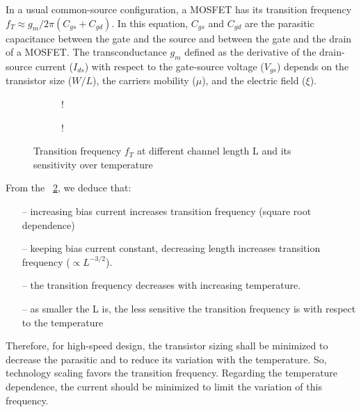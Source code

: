 In a usual common-source configuration, a MOSFET has its transition frequency \(f_T \approx g_m/2\pi (C_{gs}+C_{gd})\). In this equation, \(C_{gs} \) and  \(C_{gd} \) are the parasitic capacitance between the gate and the source and between the gate and the drain of a MOSFET. The transconductance \(g_m \) defined as the derivative of the drain-source current (\(I_{ds} \)) with respect to the gate-source voltage (\(V_{gs}\)) depends on the transistor size (\(W/L\)), the carriers mobility (\(\mu \)), and the electric field (\(\xi \)).

\begin{figure}[!ht]
	\centering
	\begin{subfigure}[b]{0.48\textwidth}
		\resizebox {\textwidth} {!} {
			
		}
	\end{subfigure}
	\begin{subfigure}[b]{0.48\textwidth}
		\resizebox {\textwidth} {!} {
			
		}
		\label{fig:ft_nel_sensitivity}
	\end{subfigure}
	\caption{Transition frequency \(f_T\) at different channel length L and its sensitivity over temperature}
	\label{fig:ft_nel}
\end{figure}

From the \figurename~\ref{fig:ft_nel}, we deduce that:
\begin{itemize}
	\item[--] increasing bias current increases transition frequency (square root dependence)
	\item[--] keeping bias current constant, decreasing length increases transition frequency (\(\propto L^{-3/2}\)).
	\item[--] the transition frequency decreases with increasing temperature.
	\item[--] as smaller the L is, the less sensitive the transition frequency is with respect to the temperature
\end{itemize}
Therefore, for high-speed design, the transistor sizing shall be minimized to decrease the parasitic and to reduce its variation with the temperature. So, technology scaling favors the transition frequency. Regarding the temperature dependence, the current should be minimized to limit the variation of this frequency.

